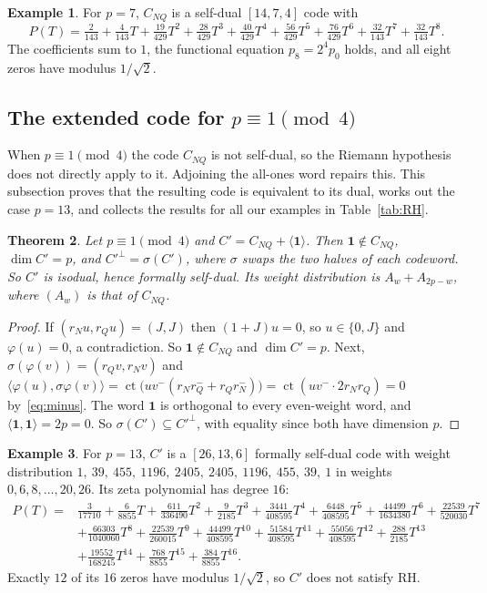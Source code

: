 \documentclass[12pt,letterpaper]{article}
\newtheorem{theorem}{Theorem}[section]
\theoremstyle{definition}
\newtheorem{example}[theorem]{Example}
\theoremstyle{remark}
\numberwithin{equation}{section}
\newcommand{\ct}{\operatorname{ct}}
\newcommand{\CNQ}{C_{NQ}}
\begin{document}
\begin{example}\label{ex:zeta7}
For $p=7$, $\CNQ$ is a self-dual $[14,7,4]$ code with
\[
P(T)=\tfrac{2}{143}+\tfrac{4}{143}T+\tfrac{19}{429}T^2+\tfrac{28}{429}T^3
+\tfrac{40}{429}T^4+\tfrac{56}{429}T^5+\tfrac{76}{429}T^6+\tfrac{32}{143}T^7
+\tfrac{32}{143}T^8 .
\]
The coefficients sum to $1$, the functional equation $p_8=2^4p_0$ holds, and all
eight zeros have modulus $1/\sqrt2$.
\end{example}

\subsection{\texorpdfstring{The extended code for $p\equiv1\pmod4$}{The extended code for p = 1 (mod 4)}}
When $p\equiv1\pmod4$ the code $\CNQ$ is not self-dual, so the Riemann hypothesis
does not directly apply to it. Adjoining the all-ones word repairs this. This
subsection proves that the resulting code is equivalent to its dual, works out the
case $p=13$, and collects the results for all our examples in Table~\ref{tab:RH}.

\begin{theorem}\label{thm:isodual}
Let $p\equiv1\pmod4$ and $C'=\CNQ+\langle\mathbf 1\rangle$. Then $\mathbf1\notin\CNQ$,
$\dim C'=p$, and $C'^\perp=\sigma(C')$, where $\sigma$ swaps the two halves of each
codeword. So $C'$ is isodual, hence formally self-dual. Its weight distribution is
$A_w+A_{2p-w}$, where $(A_w)$ is that of $\CNQ$.
\end{theorem}

\begin{proof}
If $(r_Nu,r_Qu)=(J,J)$ then $(1+J)u=0$, so $u\in\{0,J\}$ and $\varphi(u)=0$, a
contradiction. So $\mathbf 1\notin\CNQ$ and $\dim C'=p$. Next,
$\sigma(\varphi(v))=(r_Qv,r_Nv)$ and
$\langle\varphi(u),\sigma\varphi(v)\rangle=\ct\big(uv^-(r_Nr_Q^-+r_Qr_N^-)\big)
=\ct(uv^-\cdot2r_Nr_Q)=0$ by~\eqref{eq:minus}. The word $\mathbf 1$ is orthogonal
to every even-weight word, and $\langle\mathbf1,\mathbf1\rangle=2p=0$. So
$\sigma(C')\subseteq C'^\perp$, with equality since both have dimension $p$.
\end{proof}

\begin{example}\label{ex:zeta13}
For $p=13$, $C'$ is a $[26,13,6]$ formally self-dual code with weight distribution
$1,\ 39,\ 455,\ 1196,\ 2405,\ 2405,\ 1196,\ 455,\ 39,\ 1$ in weights
$0,6,8,\dots,20,26$. Its zeta polynomial has degree $16$:
\[
\begin{aligned}
P(T)={}&\tfrac{3}{17710}+\tfrac{6}{8855}T+\tfrac{611}{336490}T^2+\tfrac{9}{2185}T^3
+\tfrac{3441}{408595}T^4+\tfrac{6448}{408595}T^5+\tfrac{44499}{1634380}T^6
+\tfrac{22539}{520030}T^7\\
&+\tfrac{66303}{1040060}T^8+\tfrac{22539}{260015}T^9+\tfrac{44499}{408595}T^{10}
+\tfrac{51584}{408595}T^{11}+\tfrac{55056}{408595}T^{12}+\tfrac{288}{2185}T^{13}\\
&+\tfrac{19552}{168245}T^{14}+\tfrac{768}{8855}T^{15}+\tfrac{384}{8855}T^{16}.
\end{aligned}
\]
Exactly $12$ of its $16$ zeros have modulus $1/\sqrt2$, so $C'$ does not satisfy RH.
\end{example}
\end{document}
